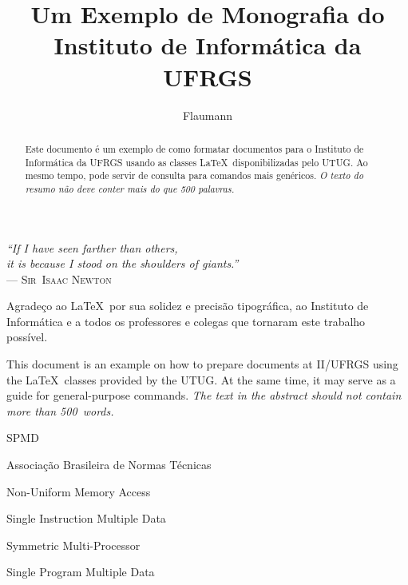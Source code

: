 \documentclass[ppgc,mestrado,biblatex]{iiufrgs}
\title{Um Exemplo de Monografia do Instituto de Informática da UFRGS}
\author{Flaumann}{Fritz Gutenberg}
\begin{document}
\maketitle

\begin{dedicatoria}
\textit{``If I have seen farther than others,\\
it is because I stood on the shoulders of giants.''\\}
--- \textsc{Sir~Isaac Newton}
\end{dedicatoria}

\begin{agradecimentos}
Agradeço ao \LaTeX\ por sua solidez e precisão tipográfica, ao Instituto de Informática e a todos os professores e colegas que tornaram este trabalho possível.
\end{agradecimentos}

\begin{abstract}
Este documento é um exemplo de como formatar documentos para o
Instituto de Informática da UFRGS usando as classes \LaTeX\
disponibilizadas pelo UTUG\@. Ao mesmo tempo, pode servir de consulta
para comandos mais genéricos. \emph{O texto do resumo não deve
conter mais do que 500 palavras.}
\end{abstract}

\begin{translatedabstract}
This document is an example on how to prepare documents at II/UFRGS
using the \LaTeX\ classes provided by the UTUG\@. At the same time, it
may serve as a guide for general-purpose commands. \emph{The text in
the abstract should not contain more than 500~words.}
\end{translatedabstract}

\begin{listofabbrv}{SPMD}
        \item[ABNT] Associação Brasileira de Normas Técnicas
        \item[NUMA] Non-Uniform Memory Access
        \item[SIMD] Single Instruction Multiple Data
        \item[SMP] Symmetric Multi-Processor
        \item[SPMD] Single Program Multiple Data
\end{listofabbrv}
\end{document}
